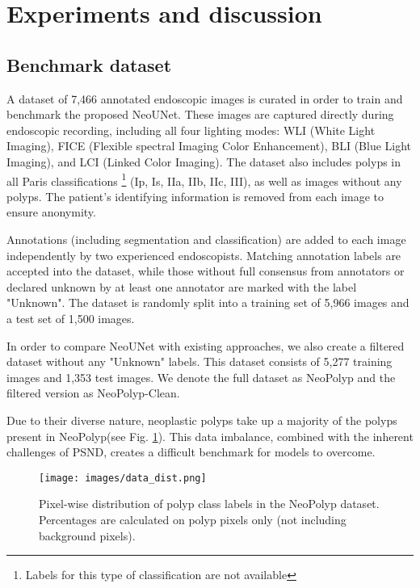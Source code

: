 \documentclass[runningheads]{llncs}
\newcommand{\ModelName}{NeoUNet\xspace}
\newcommand{\DatasetName}{NeoPolyp\xspace}
\newcommand{\CleanDatasetName}{NeoPolyp-Clean\xspace}
\begin{document}
	\section{Experiments and discussion}
	\label{sec:experiment}
	\subsection{Benchmark dataset}
	\label{sec:experiemn}
	A dataset of 7,466 annotated endoscopic images is curated in order to train and benchmark the proposed \ModelName{}. These images are captured directly during endoscopic recording, including all four lighting modes: WLI (White Light Imaging), FICE (Flexible spectral Imaging Color Enhancement), BLI (Blue Light Imaging), and LCI (Linked Color Imaging). The dataset also includes polyps in all Paris classifications \cite{lambert2003paris} \footnote{Labels for this type of classification are not available} (Ip, Is, IIa, IIb, IIc, III), as well as images without any polyps. The patient's identifying information is removed from each image to ensure anonymity.

	Annotations (including segmentation and classification) are added to each image independently by two experienced endoscopists. Matching annotation labels are accepted into the dataset, while those without full consensus from annotators or declared unknown by at least one annotator are marked with the label "Unknown". The dataset is randomly split into a training set of 5,966 images and a test set of 1,500 images.

	In order to compare \ModelName with existing approaches, we also create a filtered dataset without any "Unknown" labels. This dataset consists of 5,277 training images and 1,353 test images. We denote the full dataset as \DatasetName and the filtered version as \CleanDatasetName{}.

	Due to their diverse nature, neoplastic polyps take up a majority of the polyps present in \DatasetName (see Fig. \ref{fig:data_dist}). This data imbalance, combined with the inherent challenges of PSND, creates a difficult benchmark for models to overcome.

	\begin{figure}[]
		\centering
		\texttt{[image: images/data\_dist.png]}
		\caption{Pixel-wise distribution of polyp class labels in the \DatasetName dataset. Percentages are calculated on polyp pixels only (not including background pixels).}
		\label{fig:data_dist}
	\end{figure}
\end{document}

